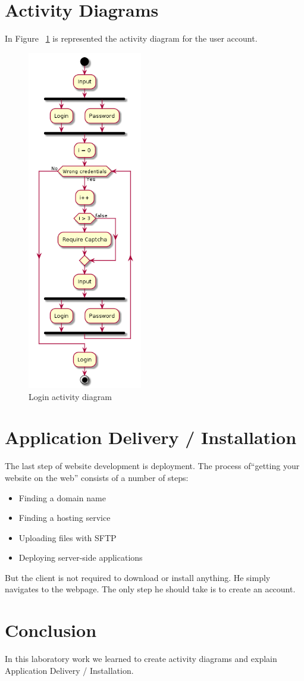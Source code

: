 \documentclass[12pt,a4paper,titlepage]{article}
\begin{document}
\section{Activity Diagrams}
In Figure ~\ref{fig:login} is represented the activity diagram for the user account.
\begin{figure}[H]
\centering
	\includegraphics[width=5cm]{login}
	\caption{Login activity diagram}
	\label{fig:login}
\end{figure}

\section{Application Delivery / Installation}
The last step of website development is deployment. The process of“getting your website on the web” consists of a number of steps:

\begin{itemize}
	\item
	Finding a domain name
\item
	Finding a hosting service
\item
	Uploading files with SFTP
	\item 
	Deploying server-side applications
\end{itemize}

But the client is not required to download or install anything. He simply navigates to the webpage. The only step he should take is to create an account.

\section{Conclusion}
In this laboratory work we learned to create activity diagrams and explain Application Delivery / Installation.

\clearpage
\cleardoublepage
\end{document}
